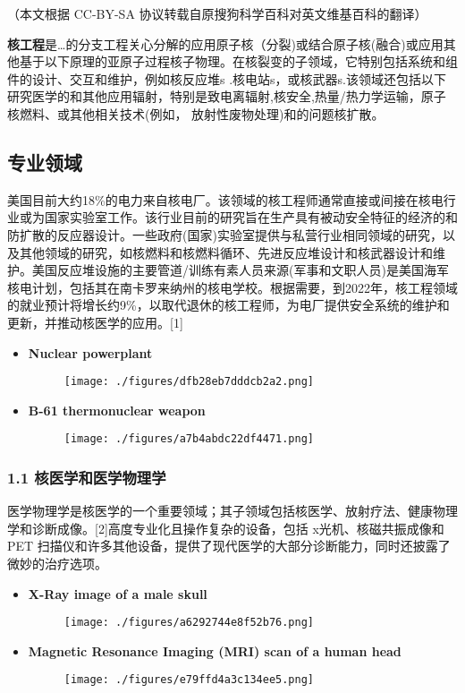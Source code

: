 
（本文根据 CC-BY-SA 协议转载自原搜狗科学百科对英文维基百科的翻译）

\textbf{核工程}是…的分支工程关心分解的应用原子核（分裂)或结合原子核(融合)或应用其他基于以下原理的亚原子过程核子物理。在核裂变的子领域，它特别包括系统和组件的设计、交互和维护，例如核反应堆s .核电站s，或核武器s.该领域还包括以下研究医学的和其他应用辐射，特别是致电离辐射,核安全,热量/热力学运输，原子核燃料、或其他相关技术(例如， 放射性废物处理)和的问题核扩散。

\subsection{专业领域}
美国目前大约18\%的电力来自核电厂。该领域的核工程师通常直接或间接在核电行业或为国家实验室工作。该行业目前的研究旨在生产具有被动安全特征的经济的和防扩散的反应器设计。一些政府(国家)实验室提供与私营行业相同领域的研究，以及其他领域的研究，如核燃料和核燃料循环、先进反应堆设计和核武器设计和维护。美国反应堆设施的主要管道/训练有素人员来源(军事和文职人员)是美国海军核电计划，包括其在南卡罗来纳州的核电学校。根据需要，到2022年，核工程领域的就业预计将增长约9\%，以取代退休的核工程师，为电厂提供安全系统的维护和更新，并推动核医学的应用。[1]
\begin{itemize}
\item \textbf{Nuclear powerplant}
\begin{figure}[ht]
\centering
\texttt{[image: ./figures/dfb28eb7dddcb2a2.png]}
\caption \label{fig_HGC_1}
\end{figure}
\item \textbf{B-61 thermonuclear weapon}
\begin{figure}[ht]
\centering
\texttt{[image: ./figures/a7b4abdc22df4471.png]}
\caption\label{fig_HGC_2}
\end{figure}
\end{itemize}

\subsubsection{1.1 核医学和医学物理学}
医学物理学是核医学的一个重要领域；其子领域包括核医学、放射疗法、健康物理学和诊断成像。[2]高度专业化且操作复杂的设备，包括 x光机、核磁共振成像和 PET 扫描仪和许多其他设备，提供了现代医学的大部分诊断能力，同时还披露了微妙的治疗选项。
\begin{itemize}
\item \textbf{X-Ray image of a male skull}
\begin{figure}[ht]
\centering
\texttt{[image: ./figures/a6292744e8f52b76.png]}
\caption\label{fig_HGC_3}
\end{figure}
\item \textbf{Magnetic Resonance Imaging (MRI) scan of a human head}
\begin{figure}[ht]
\centering
\texttt{[image: ./figures/e79ffd4a3c134ee5.png]}
\caption \label{fig_HGC_5}
\end{figure}
\oit
\end{itemize}

